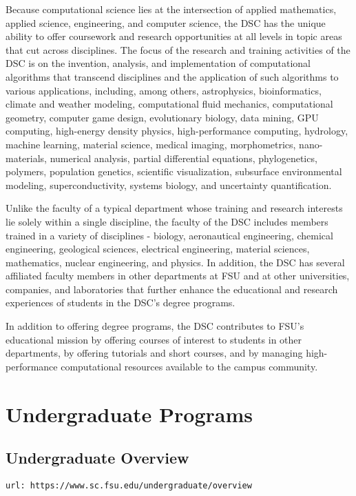 \documentclass[12pt,a4paper]{article}
\begin{document}
Because computational science lies at the intersection of applied mathematics, applied science, engineering, and computer science, the DSC has the unique ability to offer coursework and research opportunities at all levels in topic areas that cut across disciplines. The focus of the research and training activities of the DSC is on the invention, analysis, and implementation of computational algorithms that transcend disciplines and the application of such algorithms to various applications, including, among others, astrophysics, bioinformatics, climate and weather modeling, computational fluid mechanics, computational geometry, computer game design, evolutionary biology, data mining, GPU computing, high-energy density physics, high-performance computing, hydrology, machine learning, material science, medical imaging, morphometrics, nano-materials, numerical analysis, partial differential equations, phylogenetics, polymers, population genetics, scientific visualization, subsurface environmental modeling, superconductivity, systems biology, and uncertainty quantification.

Unlike the faculty of a typical department whose training and research interests lie solely within a single discipline, the faculty of the DSC includes members trained in a variety of disciplines - biology, aeronautical engineering, chemical engineering, geological sciences, electrical engineering, material sciences, mathematics, nuclear engineering, and physics. In addition, the DSC has several affiliated faculty members in other departments at FSU and at other universities, companies, and laboratories that further enhance the educational and research experiences of students in the DSC's degree programs.

In addition to offering degree programs, the DSC contributes to FSU's educational mission by offering courses of interest to students in other departments, by offering tutorials and short courses, and by managing high-performance computational resources available to the campus community.

\section{Undergraduate Programs}

\subsection{Undergraduate Overview}
\texttt{url: https://www.sc.fsu.edu/undergraduate/overview}
\end{document}
